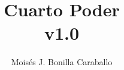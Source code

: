 \documentclass{book}
\begin{document}
\title{Cuarto Poder \\ v1.0}
\author{Moisés J. Bonilla Caraballo}
 
\maketitle
\end{document}
